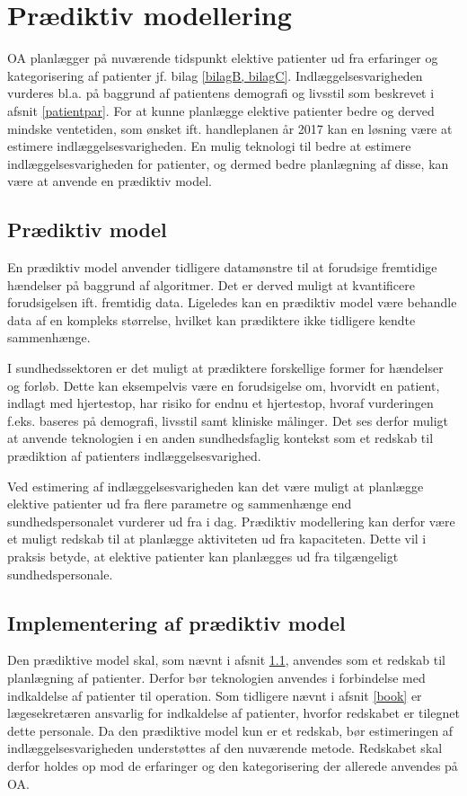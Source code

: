 \chapter{Prædiktiv modellering}
OA planlægger på nuværende tidspunkt elektive patienter ud fra erfaringer og kategorisering af patienter jf. bilag \ref{bilagB, bilagC}. Indlæggelsesvarigheden vurderes bl.a. på baggrund af patientens demografi og livsstil som beskrevet i afsnit \ref{patientpar}. For at kunne planlægge elektive patienter bedre og derved mindske ventetiden, som ønsket ift. handleplanen år 2017 kan en løsning være at estimere indlæggelsesvarigheden. En mulig teknologi til bedre at estimere indlæggelsesvarigheden for patienter, og dermed bedre planlægning af disse, kan være at anvende en prædiktiv model. 


\section{Prædiktiv model} \label{praemodel}
En prædiktiv model anvender tidligere datamønstre til at forudsige fremtidige hændelser på baggrund af algoritmer. Det er derved muligt at kvantificere forudsigelsen ift. fremtidig data\cite{Kuhn2013}. Ligeledes kan en prædiktiv model være behandle data af en kompleks størrelse, hvilket kan prædiktere ikke tidligere kendte sammenhænge.  


I sundhedssektoren er det muligt at prædiktere forskellige former for hændelser og forløb. Dette kan eksempelvis være en forudsigelse om, hvorvidt en patient, indlagt med hjertestop, har risiko for endnu et hjertestop, hvoraf vurderingen f.eks. baseres på demografi, livsstil samt kliniske målinger\cite{Hastie2008}. Det ses derfor muligt at anvende teknologien i en anden sundhedsfaglig kontekst som et redskab til prædiktion af patienters indlæggelsesvarighed.


Ved estimering af indlæggelsesvarigheden kan det være muligt at planlægge elektive patienter ud fra flere parametre og sammenhænge end sundhedspersonalet vurderer ud fra i dag. Prædiktiv modellering kan derfor være et muligt redskab til at planlægge aktiviteten ud fra kapaciteten. Dette vil i praksis betyde, at elektive patienter kan planlægges ud fra tilgængeligt sundhedspersonale. 


\section{Implementering af prædiktiv model}
Den prædiktive model skal, som nævnt i afsnit \ref{praemodel}, anvendes som et redskab til planlægning af patienter. Derfor bør teknologien anvendes i forbindelse med indkaldelse af patienter til operation. Som tidligere nævnt i afsnit \ref{book} er lægesekretæren ansvarlig for indkaldelse af patienter, hvorfor redskabet er tilegnet dette personale. Da den prædiktive model kun er et redskab, bør estimeringen af indlæggelsesvarigheden understøttes af den nuværende metode. Redskabet skal derfor holdes op mod de erfaringer og den kategorisering der allerede anvendes på OA.


